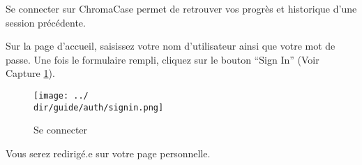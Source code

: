 Se connecter sur ChromaCase permet de retrouver vos progrès et historique d’une session précédente.

Sur la page d'accueil, saisissez votre nom d’utilisateur ainsi que votre mot de passe.
Une fois le formulaire rempli, cliquez sur le bouton “Sign In” (Voir Capture \ref{fig:signin}).

\begin{figure}[H]
	\begin{center}
		\texttt{[image: ../\\dir/guide/auth/signin.png]}
		\caption{Se connecter}
		\label{fig:signin}
	\end{center}
\end{figure}

Vous serez redirigé.e sur votre page personnelle.

